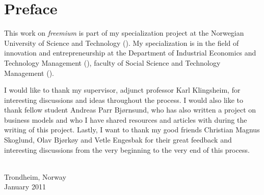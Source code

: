 \chapter*{Preface}

This work on \emph{freemium} is part of my specialization project at the Norwegian University of Science and Technology (). My specialization is in the field of innovation and entrepreneurship at the Department of Industrial Economics and Technology Management (), faculty of Social Science and Technology Management ().

I would like to thank my supervisor, adjunct professor Karl Klingsheim, for interesting discussions and ideas throughout the process. I would also like to thank fellow student Andreas Parr Bjørnsund, who has also written a project on business models and who I have shared resources and articles with during the writing of this project. Lastly, I want to thank my good friends Christian Magnus Skoglund, Olav Bjørkøy and Vetle Engesbak for their great feedback and interesting discussions from the very beginning to the very end of this process.

\par
\vspace{1em}

{ \\ Trondheim, Norway \\ January 2011\par}